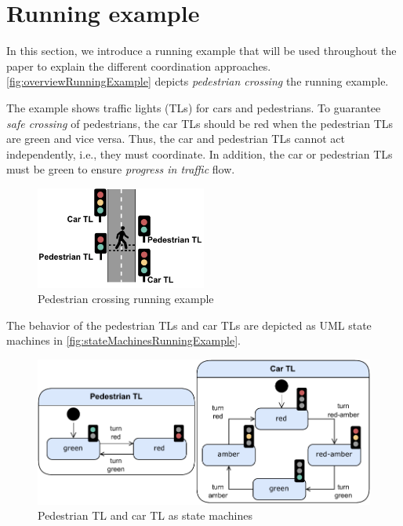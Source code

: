 \documentclass[runningheads]{llncs}
\begin{document}
\section{Running example}
In this section, we introduce a running example that will be used throughout the paper to explain the different coordination approaches.
\autoref{fig:overviewRunningExample} depicts \textit{pedestrian crossing} the running example.

The example shows traffic lights (TLs) for cars and pedestrians.
To guarantee \textit{safe crossing} of pedestrians, the car TLs should be red when the pedestrian TLs are green and vice versa.
Thus, the car and pedestrian TLs cannot act independently, i.e., they must coordinate.
In addition, the car or pedestrian TLs must be green to ensure \textit{progress in traffic} flow.

\begin{figure}[ht]
	\centering
	\includegraphics[width=0.5\textwidth]{images/running_example_schematic}
	\caption{Pedestrian crossing running example}
	\label{fig:overviewRunningExample}
\end{figure}

The behavior of the pedestrian TLs and car TLs are depicted as UML state machines \cite{objectmanagementgroupUnifiedModelingLanguage2017} in \autoref{fig:stateMachinesRunningExample}.

\begin{figure}[ht]
	\centering
	\includegraphics[width=1\textwidth]{images/running_example_models}
	\caption{Pedestrian TL and car TL as state machines}
	\label{fig:stateMachinesRunningExample}
\end{figure}
\end{document}
